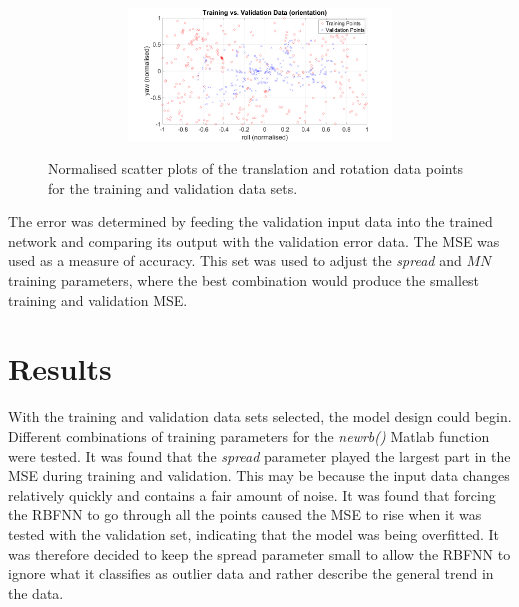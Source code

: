 \begin{figure}
\begin{subfigure}{\textwidth}
\begin{subfigure}{0.48\textwidth}
    \end{subfigure}
    \begin{subfigure}{0.48\textwidth}
      \includegraphics[clip, trim = 80 0 80 0, width=\textwidth]{figures/chapter4/trv_rollyaw}
    \end{subfigure}
    \caption{}
  \end{subfigure}
  \caption[Scatter plots of the training and validation data. ]{Normalised scatter plots of the translation and rotation data points for the training and validation data sets. }
  \label{fig:chap4-scatter-tr-v}
\end{figure}

The error was determined by feeding the validation input data into the trained network and comparing its output with the validation error data. The MSE was used as a measure of accuracy. This set was used to adjust the \emph{spread} and $\mathit{MN}$ training parameters, where the best combination would produce the smallest training and validation MSE. 

\section{Results}

With the training and validation data sets selected, the model design could begin. Different combinations of training parameters for the \emph{newrb()} Matlab function were tested. It was found that the \emph{spread} parameter played the largest part in the MSE during training and validation. This may be because the input data changes relatively quickly and contains a fair amount of noise. It was found that forcing the RBFNN to go through all the points caused the MSE to rise when it was tested with the validation set, indicating that the model was being overfitted. It was therefore decided to keep the spread parameter small to allow the RBFNN to ignore what it classifies as outlier data and rather describe the general trend in the data. 

